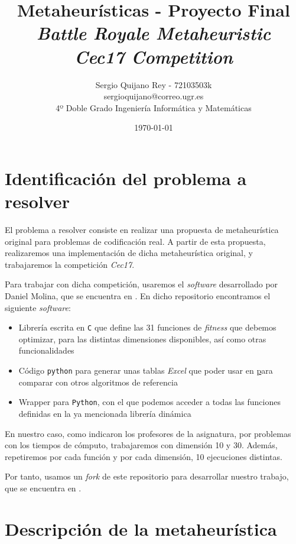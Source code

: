 \documentclass[11pt]{article}
\title{
    {Metaheurísticas - Proyecto Final}\\
    {\emph{Battle Royale Metaheuristic}}\\
    {\emph{Cec17 Competition}}
}
\author{
    {Sergio Quijano Rey - 72103503k}\\
    {sergioquijano@correo.ugr.es} \\
    {4º Doble Grado Ingeniería Informática y Matemáticas}
}
\date{\today}
\begin{document}
\maketitle
\pagebreak

\tableofcontents

\listoffigures

\listoftables

\pagebreak
\section{Identificación del problema a resolver}

El problema a resolver consiste en realizar una propuesta de metaheurística original para problemas de codificación real. A partir de esta propuesta, realizaremos una implementación de dicha metaheurística original, y trabajaremos la competición \emph{Cec17}.

Para trabajar con dicha competición, usaremos el \emph{software} desarrollado por Daniel Molina, que se encuentra en \cite{daniel_repo:online}. En dicho repositorio encontramos el siguiente \emph{software}:

\begin{itemize}
    \item Librería escrita en \lstinline{C} que define las 31 funciones de \emph{fitness} que debemos optimizar, para las distintas dimensiones disponibles, así como otras funcionalidades
    \item Código \lstinline{python} para generar unas tablas \emph{Excel} que poder usar en \href{tacolab.org} para comparar con otros algoritmos de referencia
    \item Wrapper para \lstinline{Python}, con el que podemos acceder a todas las funciones definidas en la ya mencionada librería dinámica
\end{itemize}

En nuestro caso, como indicaron los profesores de la asignatura, por problemas con los tiempos de cómputo, trabajaremos con dimensión 10 y 30. Además, repetiremos por cada función y por cada dimensión, 10 ejecuciones distintas.

Por tanto, usamos un \emph{fork} de este repositorio para desarrollar nuestro trabajo, que se encuentra en \cite{repositorio:online}.

\pagebreak
\section{Descripción de la metaheurística} \label{descripcion}
\end{document}
